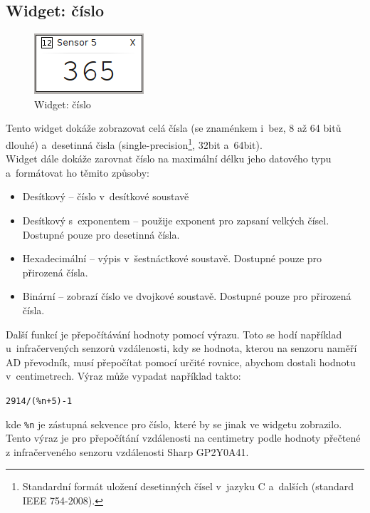 \documentclass[12pt, a4paper, oneside]{article}
\begin{document}
\subsection{Widget: číslo}
\begin{figure}[H]
\begin{center}
\includegraphics[scale=1]{img/w_num.png}
\caption{Widget: číslo}
\end{center}
\end{figure}
Tento widget dokáže zobrazovat celá čísla (se znaménkem i~bez, 8 až 64 bitů dlouhé) a~desetinná čisla (single-precision\footnote{Standardní formát uložení desetinných čísel v~jazyku C a~dalších (standard IEEE 754-2008).}, 32bit a~64bit).\\
Widget dále dokáže zarovnat číslo na maximální délku jeho datového typu\\a~formátovat ho těmito způsoby:
\begin{itemize}
    \item Desítkový -- číslo v~desítkové soustavě
    \item Desítkový s~exponentem -- použije exponent pro zapsaní velkých čísel. Dostupné pouze pro desetinná čísla.
    \item Hexadecimální -- výpis v~šestnáctkové soustavě. Dostupné pouze pro přirozená čísla. 
    \item Binární -- zobrazí číslo ve dvojkové soustavě.  Dostupné pouze pro přirozená čísla.
\end{itemize}

Další funkcí je přepočítávání hodnoty pomocí výrazu. Toto se hodí například u~infračervených senzorů vzdálenosti, kdy se hodnota, kterou na senzoru naměří AD převodník, musí přepočítat pomocí určité rovnice, abychom dostali hodnotu v~centimetrech. Výraz může vypadat například takto:
\begin{center}
\verb|2914/(%n+5)-1|
\end{center}
kde \verb|%n| je zástupná sekvence pro číslo, které by se jinak ve widgetu zobrazilo. Tento výraz je pro přepočítání vzdálenosti na centimetry podle hodnoty přečtené z infračerveného senzoru vzdálenosti Sharp GP2Y0A41.
\end{document}
